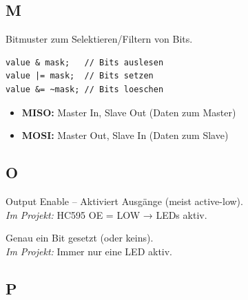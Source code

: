\subsection*{M}

\begin{description}[style=nextline, leftmargin=2.5cm, labelwidth=2.3cm]

\item[Maske]
Bitmuster zum Selektieren/Filtern von Bits.
\begin{lstlisting}[style=arduino,numbers=none]
value & mask;   // Bits auslesen
value |= mask;  // Bits setzen
value &= ~mask; // Bits loeschen
\end{lstlisting}

\item[MISO / MOSI]
\begin{itemize}[nosep, leftmargin=1.5em]
\item \textbf{MISO:} Master In, Slave Out (Daten zum Master)
\item \textbf{MOSI:} Master Out, Slave In (Daten zum Slave)
\end{itemize}

\end{description}

\subsection*{O}

\begin{description}[style=nextline, leftmargin=2.5cm, labelwidth=2.3cm]

\item[OE]
Output Enable – Aktiviert Ausgänge (meist active-low).\\
\textit{Im Projekt:} HC595 OE = LOW → LEDs aktiv.

\item[One-Hot]
Genau ein Bit gesetzt (oder keins).\\
\textit{Im Projekt:} Immer nur eine LED aktiv.

\end{description}

\subsection*{P}

